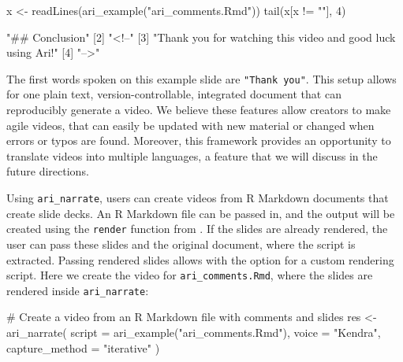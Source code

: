 \begin{Schunk}
\begin{Sinput}
x <- readLines(ari_example("ari_comments.Rmd"))
tail(x[x != ""], 4)
\end{Sinput}
\begin{Soutput}
[1] "## Conclusion"                                             
[2] "<!--"                                                      
[3] "Thank you for watching this video and good luck using Ari!"
[4] "-->"                                                       
\end{Soutput}
\end{Schunk}

The first words spoken on this example slide are \texttt{"Thank\ you"}.
This setup allows for one plain text, version-controllable, integrated
document that can reproducibly generate a video. We believe these
features allow creators to make agile videos, that can easily be updated
with new material or changed when errors or typos are found. Moreover,
this framework provides an opportunity to translate videos into multiple
languages, a feature that we will discuss in the future directions.

Using \texttt{ari\_narrate}, users can create videos from R Markdown
documents that create slide decks. An R Markdown file can be passed in,
and the output will be created using the \texttt{render} function from
 \citep{rmarkdown}. If the slides are already rendered,
the user can pass these slides and the original document, where the
script is extracted. Passing rendered slides allows with the option for
a custom rendering script. Here we create the video for
\texttt{ari\_comments.Rmd}, where the slides are rendered inside
\texttt{ari\_narrate}:

\begin{Schunk}
\begin{Sinput}
# Create a video from an R Markdown file with comments and slides
res <- ari_narrate(
  script = ari_example("ari_comments.Rmd"),
  voice = "Kendra",
  capture_method = "iterative"
)
\end{Sinput}
\end{Schunk}

